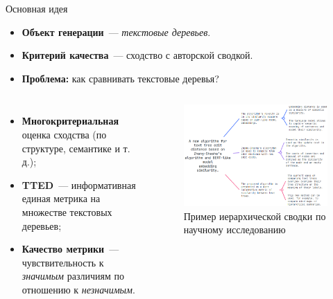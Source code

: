\documentclass{beamer}
\begin{document}
\begin{frame}{Основная идея}

\begin{itemize}
    \item \textbf{Объект генерации}~--- \textit{текстовые деревьев}.
    \item \textbf{Критерий качества}~--- сходство с авторской сводкой.
    \item \textbf{Проблема:} как сравнивать текстовые деревья?
\end{itemize}

\begin{columns}
        \begin{itemize}
            \item \textbf{Многокритериальная} оценка сходства (по структуре, семантике и т.\,д.);
            \item \textbf{TTED}~--- информативная единая метрика на множестве текстовых деревьев;
            \item \textbf{Качество метрики}~--- чувствительность к \textit{значимым} различиям по отношению к \textit{незначимым}.
        \end{itemize}
    
    \begin{figure}
        \centering
        \includegraphics[width=\linewidth]{img/map_example.png}
        \caption{Пример иерархической сводки по научному исследованию}
        \label{fig:map_example}
    \end{figure}
\end{columns}

\end{frame}
\end{document}
